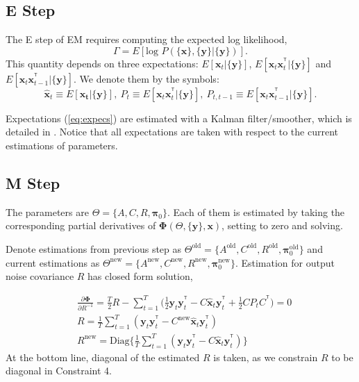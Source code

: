 \documentclass[fleqn]{article}
\let\oldref\ref
\renewcommand{\ref}[1]{(\oldref{#1})}
\newcommand{\T}{^{\ensuremath{\mathsf{T}}}}           %
\begin{document}
\subsection{E Step}
The E step of EM requires computing the expected log likelihood,
\[
    \Gamma = E[\text{log }P(\{\mathbf{x}\},\{\mathbf{y}\}|\{\mathbf{y}\})].
\]
This quantity depends on three expectations: $E[\mathbf{x}_t|\{\mathbf{y}\}]$, $E[\mathbf{x}_t\mathbf{x}_t^{\T}|\{\mathbf{y}\}]$ and $E[\mathbf{x}_t\mathbf{x}_{t-1}^{\T}|\{\mathbf{y}\}]$. We denote them by the symbols:
\begin{equation}\label{eq:expecs}
\hat{\mathbf{x}}_t \equiv E[\mathbf{x_t}|\{\mathbf{y}\}],\  P_t  \equiv E[\mathbf{x}_t\mathbf{x}_t^{\T}|\{\mathbf{y}\}],\  P_{t,t-1}  \equiv E[\mathbf{x}_t\mathbf{x}_{t-1}^{\T}|\{\mathbf{y}\}].
\end{equation}

Expectations \ref{eq:expecs} are estimated with a Kalman filter/smoother, which is detailed in . Notice that all expectations are taken with respect to the current estimations of parameters.
\subsection{M Step}
The parameters are $\Theta =\{A,C,R,\mathbf{\pi}_0\}$. Each of them is estimated by taking the corresponding partial derivatives of $\mathbf{\Phi}(\Theta,\{\mathbf{y}\},\mathbf{x})$, setting to zero and solving.

Denote estimations from previous step as $\Theta^{\text{old}} =\{A^{\text{old}},C^{\text{old}},R^{\text{old}},\mathbf{\pi}_0^{\text{old}}\}$ and current estimations as $\Theta^{\text{new}} =\{A^{\text{new}},C^{\text{new}},R^{\text{new}},\mathbf{\pi}_0^{\text{new}}\}$. Estimation for output noise covariance $R$ has closed form solution,

\begin{equation}\label{eq:updateR}
\begin{aligned}
&\frac{\partial \mathbf{\Phi}}{\partial R^{-1}} = \frac{T}{2}R - \sum\limits_{t=1}^T\bigl(\frac{1}{2}\mathbf{y}_t\mathbf{y}_t^{\T} - C\hat{\mathbf{x}}_t\mathbf{y}_t^{\T}+\frac{1}{2}CP_tC^{\T}\bigr) =0 \\
& R = \frac{1}{T}\sum\limits_{t=1}^{T}(\mathbf{y}_t\mathbf{y}_t^{\T}-C^{\text{new}}\hat{\mathbf{x}}_t\mathbf{y}_t^{\T})\\
& R^{\text{new}} =\text{Diag}\biggl\{\frac{1}{T}\sum\limits_{t=1}^{T}(\mathbf{y}_t\mathbf{y}_t^{\T}-C\hat{\mathbf{x}}_t\mathbf{y}_t^{\T})\biggr\}
\end{aligned}
\end{equation}
At the bottom line, diagonal of the estimated $R$ is taken, as we constrain $R$ to be diagonal in Constraint 4.
\end{document}
